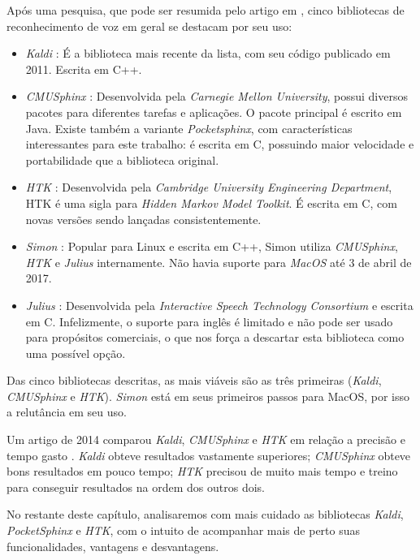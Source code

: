 Após uma pesquisa, que pode ser resumida pelo artigo em \citep{speechRecog:16},
cinco bibliotecas de reconhecimento de voz em geral se destacam por seu uso:

\begin{itemize}
\item \emph{Kaldi} \citep{kaldi}: É a biblioteca mais recente da lista, com seu
código publicado em 2011. Escrita em C++.

\item \emph{CMUSphinx} \citep{cmusphinx}: Desenvolvida pela \emph{Carnegie Mellon
University}, possui diversos pacotes para diferentes tarefas e aplicações. O pacote
principal é escrito em Java. Existe também a variante \emph{Pocketsphinx}, com
características interessantes para este trabalho: é escrita em C, possuindo maior
velocidade e portabilidade que a biblioteca original.

\item \emph{HTK} \citep{htk}: Desenvolvida pela \emph{Cambridge University
Engineering Department}, HTK é uma sigla para \emph{Hidden Markov Model Toolkit}. É
escrita em C, com novas versões sendo lançadas consistentemente.

\item \emph{Simon} \citep{Simon}: Popular para Linux e escrita em C++, Simon utiliza
\emph{CMUSphinx}, \emph{HTK} e \emph{Julius} internamente. Não havia suporte para
\emph{MacOS} até 3 de abril de 2017.

\item \emph{Julius} \citep{Julius}: Desenvolvida pela \emph{Interactive Speech
Technology Consortium} e escrita em C. Infelizmente, o suporte para inglês é
limitado e não pode ser usado para propósitos comerciais, o que nos força a
descartar esta biblioteca como uma possível opção.
\end{itemize}

Das cinco bibliotecas descritas, as mais viáveis são as três primeiras (\emph{Kaldi},
\emph{CMUSphinx} e \emph{HTK}). \emph{Simon} está em seus primeiros passos para
MacOS, por isso a relutância em seu uso.

Um artigo de 2014 comparou \emph{Kaldi}, \emph{CMUSphinx} e \emph{HTK} em relação a
precisão e tempo gasto \citep{compareSpeech}. \emph{Kaldi} obteve resultados
vastamente superiores; \emph{CMUSphinx} obteve bons resultados em pouco tempo;
\emph{HTK} precisou de muito mais tempo e treino para conseguir resultados na ordem
dos outros dois.

No restante deste capítulo, analisaremos com mais cuidado as bibliotecas
\emph{Kaldi}, \emph{PocketSphinx} e \emph{HTK}, com o intuito de acompanhar mais de
perto suas funcionalidades, vantagens e desvantagens.

